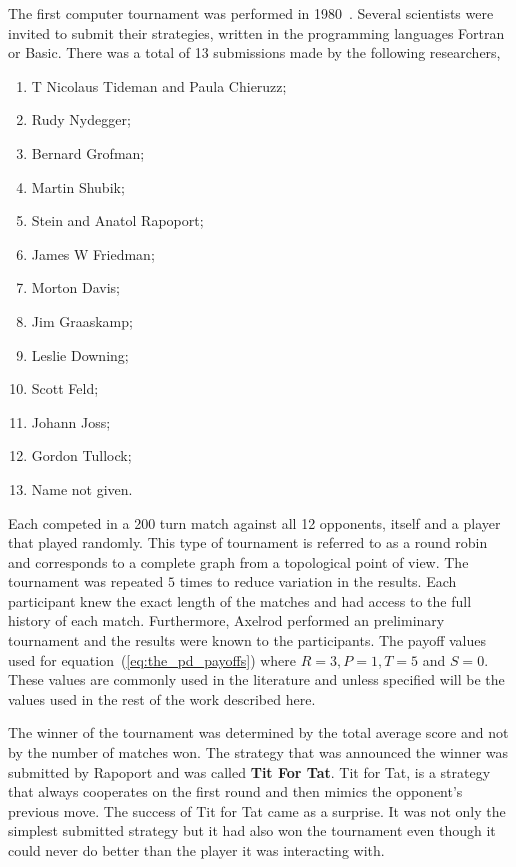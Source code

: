 \documentclass{article}
\theoremstyle{definition}
\begin{document}
The first computer tournament was performed in 1980~\cite{Axelrod1980a}.
Several scientists were invited to submit their strategies, written in the
programming languages Fortran or Basic. There was a total of 13 submissions
made by the following researchers,

\begin{multicols}{2}
    \begin{enumerate}
        \item T Nicolaus Tideman and Paula Chieruzz;
        \item Rudy Nydegger;
        \item Bernard Grofman;
        \item Martin Shubik;
        \item Stein and Anatol Rapoport;
        \item James W Friedman;
        \item Morton Davis;
        \item Jim Graaskamp;
        \item Leslie Downing;
        \item Scott Feld;
        \item Johann Joss;
        \item Gordon Tullock;
        \item Name not given.
    \end{enumerate}
\end{multicols}

Each competed in a 200 turn match against all 12 opponents, itself and a player
that played randomly. This type of tournament is referred to as a round robin and
corresponds to a complete graph from a topological point of view. The tournament
was repeated \(5\) times to reduce variation in the results. Each participant knew
the exact length of the matches and had access to the full history of each match.
Furthermore, Axelrod performed an preliminary tournament and the results were known
to the participants. The payoff values used for equation~(\ref{eq:the_pd_payoffs}) where
\(R=3, P=1, T=5\) and \(S=0\). These values are commonly used in the literature
and unless specified will be the values used in the rest of the work described here.

The winner of the tournament was determined by the total average score and not by
the number of matches won. The strategy that was announced the winner was
submitted by Rapoport and was called \textbf{Tit For Tat}. Tit for Tat, is a
strategy that always cooperates on the first round and then mimics the opponent's
previous move.
The success of Tit for Tat came as a surprise. It was not only the simplest submitted
strategy but it had also won the tournament even though it could never do better
than the player it was interacting with.
\end{document}
